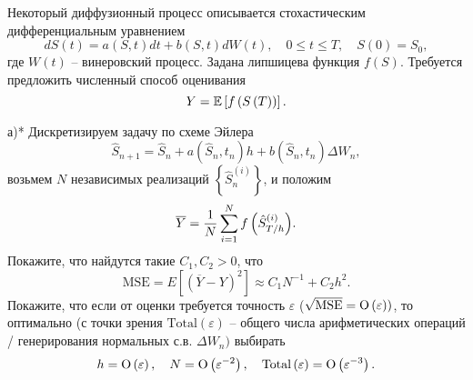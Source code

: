 \begin{problem}  
Некоторый диффузионный процесс описывается стохастическим дифференциальным уравнением
\[
dS\left( t \right)=a\left( {S,t} \right)dt+b\left( {S,t} \right)dW\left( t 
\right),
\quad
0\le t\le T,
\quad
S\left( 0 \right)=S_0 ,
\]
где $W\left( t \right)$ -- винеровский процесс. Задана липшицева функция 
$f\left( S \right)$. Требуется предложить численный способ оценивания 
\[
Y=\mathrm{{\mathbb E}}\left[ {f\left( {S\left( T \right)} \right)} \right].
\]

а)* Дискретизируем задачу по схеме Эйлера
\[
\hat {S}_{n+1} =\hat {S}_n +a\left( {\hat {S}_n ,t_n } \right)h+b\left( 
{\hat {S}_n ,t_n } \right)\Delta W_n ,
\]
возьмем $N$ независимых реализаций $\left\{ {\hat {S}_n^{\left( i \right)} } 
\right\}$, и положим
\[
\overline {Y}=\frac{1}{N}\sum\limits_{i=1}^N {f\left( {\hat {S}_{T 
\mathord{\left/ {\vphantom {T h}} \right. \kern-\nulldelimiterspace} 
h}^{\left( i \right)} } \right)} .
\]
Покажите, что найдутся такие $C_1 ,C_2 >0$, что
\[
\mbox{MSE}=E\left[ {\left( {\overline {Y}-Y} \right)^2} \right]\approx C_1 
N^{-1}+C_2 h^2.
\]
Покажите, что если от оценки требуется точность $\varepsilon $ ($\sqrt 
{\mbox{MSE}} ={\rm O}\left( \varepsilon \right))$, то оптимально (с точки 
зрения $\mbox{Total}\left( \varepsilon \right)$ -- общего числа 
арифметических операций / генерирования нормальных с.в. $\Delta W_n )$ 
выбирать
\[
h={\rm O}\left( \varepsilon \right),
\quad
N={\rm O}\left( {\varepsilon ^{-2}} \right),
\quad
\mbox{Total}\left( \varepsilon \right)={\rm O}\left( {\varepsilon ^{-3}} 
\right).
\]


\end{problem}
